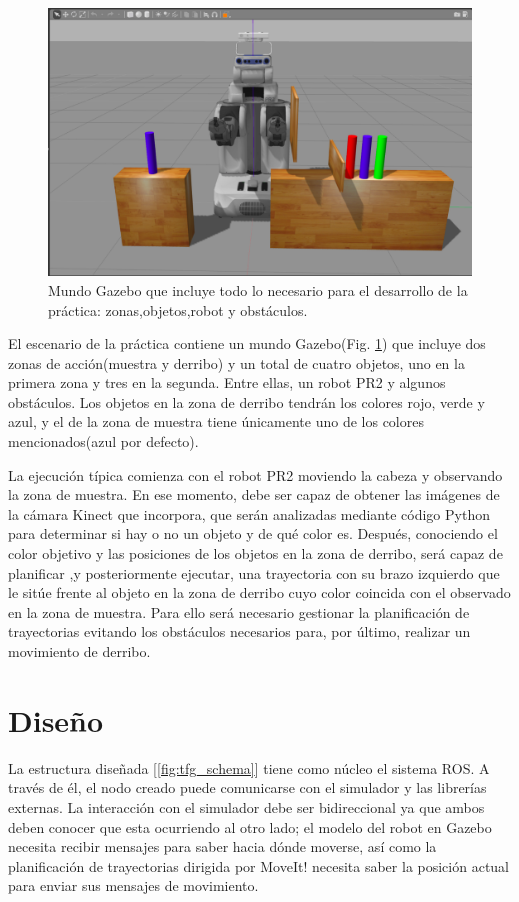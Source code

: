\documentclass[12pt,spanish,chapterprefix, numbers=noenddot]{book}
\numberwithin{equation}{section}
\numberwithin{figure}{section}
\begin{document}
\begin{figure}[hbt!]
\centering
\includegraphics[width=12cm]{Figs/tfg_gazebo_world.png}
\par
\caption{\label{fig:Mundo-gazebo}Mundo Gazebo que incluye todo lo necesario para el desarrollo de la práctica: zonas,objetos,robot y obstáculos.}
\end{figure}

El escenario de la práctica contiene un mundo Gazebo(Fig. \ref{fig:Mundo-gazebo}) que incluye dos zonas de acción(muestra y derribo) y un total de cuatro objetos, uno en la primera zona y tres en la segunda. Entre ellas, un robot PR2 y algunos obstáculos. Los objetos en la zona de derribo tendrán los colores rojo, verde y azul, y el de la zona de muestra tiene únicamente uno de los colores mencionados(azul por defecto). 

La ejecución típica comienza con el robot PR2 moviendo la cabeza y observando la zona de muestra. En ese momento, debe ser capaz de obtener las imágenes de la cámara Kinect que incorpora, que serán analizadas mediante código Python para determinar si hay o no un objeto y de qué color es. 
Después, conociendo el color objetivo y las posiciones de los objetos en la zona de derribo, será capaz de planificar ,y posteriormente ejecutar, una trayectoria con su brazo izquierdo que le sitúe frente al objeto en la zona de derribo cuyo color coincida con el observado en la zona de muestra. Para ello será necesario gestionar la planificación de trayectorias evitando los obstáculos necesarios para, por último, realizar un movimiento de derribo.

\section{Diseño}
La estructura diseñada [\ref{fig:tfg_schema}] tiene como núcleo el sistema ROS. A través de él, el nodo creado puede comunicarse con el simulador y las librerías externas. La interacción con el simulador debe ser bidireccional ya que ambos deben conocer que esta ocurriendo al otro lado; el modelo del robot en Gazebo necesita recibir mensajes para saber hacia dónde moverse, así como la planificación de trayectorias dirigida por MoveIt! necesita saber la posición actual para enviar sus mensajes de movimiento.
\end{document}
